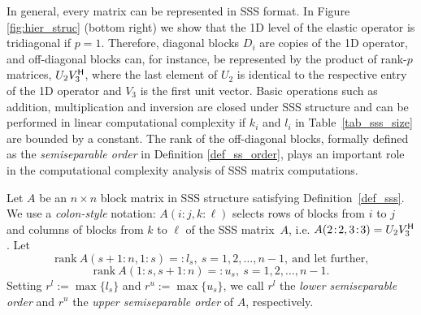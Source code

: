 {In general, every matrix can be represented in SSS format. In Figure \ref{fig:hier_struc} (bottom right) we show that the 1D level of the elastic operator is tridiagonal if $p=1$. Therefore, diagonal blocks $D_i$ are copies of the 1D operator, and off-diagonal blocks can, for instance, be represented by the product of rank-$p$ matrices, $U_2 V_3^{\mathsf{H}}$, where the last element of $U_2$ is identical to the respective entry of the 1D operator and $V_3$ is the first unit vector. Basic operations such as addition, multiplication and inversion are closed under SSS structure and can be performed in linear computational complexity if $k_i$ and $l_i$ in Table~\ref{tab_sss_size} are bounded by a constant. The rank of the off-diagonal blocks, formally defined as the \textit{sem\-iseparable order} in Definition \ref{def_ss_order}, plays an important role in the computational complexity analysis of SSS matrix computations. 


\begin{definition}\label{def_ss_order}
Let $A$ be an $n \times n$ block matrix in SSS structure satisfying Definition~\ref{def_sss}. We use a \textit{colon-style} notation: $A(i\!:\!j, k\!:\!\ell)$ selects rows of blocks from $i$ to $j$ and columns of blocks from $k$ to $\ell$ of the SSS matrix~$A$, i.e. $A(2\!:\!2,3\!:\!3) = U_2V_3^{\mathsf{H}}$. Let
\begin{equation*}
    \text{rank}\ A(s+1\!:\!n , 1\!:\!s)=:l_s,\ s=1, 2,\ldots , n-1, \ \text{and let further,}
\end{equation*}
\begin{equation*}
    \text{rank}\ A(1\!:\!s , s+1\!:\!n)=:u_s,\ s=1, 2,\ldots , n-1.
\end{equation*}
Setting $r^l := \max \{l_s\}$ and $r^u := \max \{u_s\}$, we call $r^l$ the \textit{lower semiseparable order} and $r^u$ the \textit{upper semiseparable order} of $A$, respectively.
\end{definition}

}
